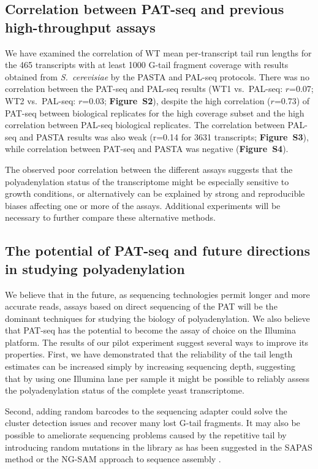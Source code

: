 \documentclass[10pt]{article}
\begin{document}
\subsection*{Correlation between PAT-seq and previous high-throughput assays}

We have examined the correlation of WT mean per-transcript tail run lengths for the 465 transcripts with at least 1000 G-tail fragment coverage with results obtained from \textit{S.~cerevisiae} by the PASTA \cite{beilharz07} and PAL-seq \cite{subtelny14} protocols. There was no correlation between the PAT-seq and PAL-seq results (WT1 vs.\ PAL-seq: $r$=0.07; WT2 vs.\ PAL-seq: $r$=0.03; \textbf{Figure~S2}), despite the high correlation ($r$=0.73) of PAT-seq between biological replicates for the high coverage subset and the high correlation between PAL-seq biological replicates. The correlation between PAL-seq and PASTA results was also weak (r=0.14 for 3631 transcripts; \textbf{Figure~S3}), while correlation between PAT-seq and PASTA was negative (\textbf{Figure~S4}).

The observed poor correlation between the different assays suggests that the polyadenylation status of the transcriptome might be especially sensitive to growth conditions, or alternatively can be explained by strong and reproducible biases affecting one or more of the assays. 
Additional experiments will be necessary to further compare these alternative methods.

\subsection*{The potential of PAT-seq and future directions in studying polyadenylation}

We believe that in the future, as sequencing technologies permit longer and more accurate reads, assays based on direct sequencing of the PAT will be the dominant techniques for studying the biology of polyadenylation. We also believe that PAT-seq has the potential to become the assay of choice on the Illumina platform.  The results of our pilot experiment suggest several ways to improve its properties. First, we have demonstrated that the reliability of the tail length estimates can be increased simply by increasing sequencing depth, suggesting that by using one Illumina lane per sample it might be possible to reliably assess the polyadenylation status of the complete yeast transcriptome. 

Second, adding random barcodes to the sequencing adapter could solve the cluster detection issues and recover many lost G-tail fragments.  It may also be possible to ameliorate sequencing problems caused by the repetitive tail by introducing random mutations in the library as has been suggested in the SAPAS method \cite{fu11} or the NG-SAM approach to sequence assembly \cite{sipos12}.
\end{document}

